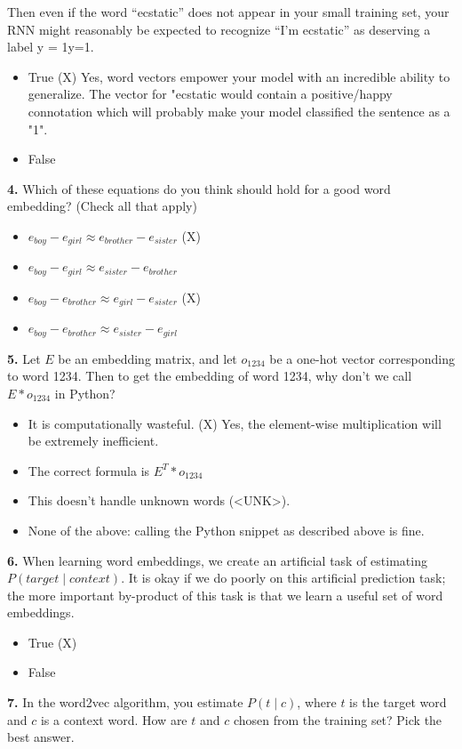 Then even if the word “ecstatic” does not appear in your small training set, your RNN might reasonably be expected to recognize “I’m ecstatic” as deserving a label y = 1y=1.
\begin{itemize}
    \item True (X) Yes, word vectors empower your model with an incredible ability to generalize. The vector for "ecstatic would contain a positive/happy connotation which will probably make your model classified the sentence as a "1".
    \item False
\end{itemize}
\textbf{4.} Which of these equations do you think should hold for a good word embedding? (Check all that apply)
\begin{itemize}
    \item $e_{boy} - e_{girl} \approx e_{brother} - e_{sister}$ (X)
    \item $e_{boy} - e_{girl} \approx e_{sister} - e_{brother}$
    \item $e_{boy} - e_{brother} \approx e_{girl} - e_{sister}$ (X)
    \item $e_{boy} - e_{brother} \approx e_{sister} - e_{girl}$
\end{itemize}
\textbf{5.} Let $E$ be an embedding matrix, and let $o_{1234}$ be a one-hot vector corresponding to word 1234. Then to get the embedding of word 1234, why don’t we call $E * o_{1234}$ in Python?
\begin{itemize}
    \item It is computationally wasteful. (X) Yes, the element-wise multiplication will be extremely inefficient.
    \item The correct formula is $E^T* o_{1234}$
    \item This doesn’t handle unknown words (<UNK>).
    \item None of the above: calling the Python snippet as described above is fine.
\end{itemize}
\textbf{6.} When learning word embeddings, we create an artificial task of estimating $P(target \mid context)$. It is okay if we do poorly on this artificial prediction task; the more important by-product of this task is that we learn a useful set of word embeddings.
\begin{itemize}
    \item True (X)
    \item False
\end{itemize}
\textbf{7.} In the word2vec algorithm, you estimate $P(t \mid c)$, where $t$ is the target word and $c$ is a context word. How are $t$ and $c$ chosen from the training set? Pick the best answer.
